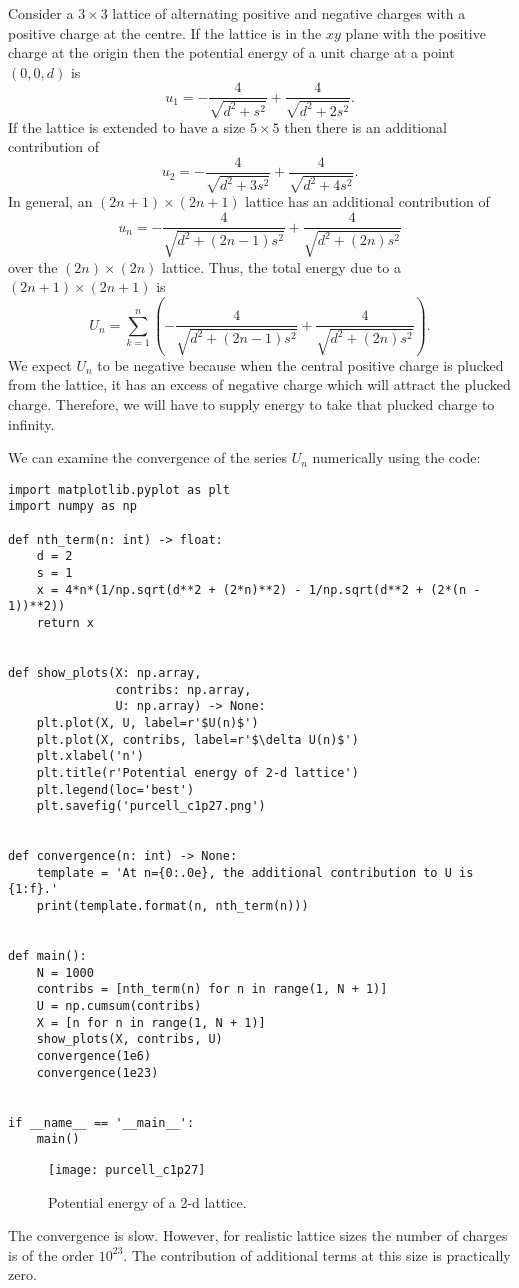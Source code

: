 \documentclass{article}
\begin{document}
\begin{enumerate}
Consider a $3 \times 3$ lattice of alternating positive and negative charges
with a positive charge at the centre. If the lattice is in the $xy$ plane with the
positive charge at the origin then the potential energy of a unit charge at a point
$(0, 0, d)$ is
\[
u_1 = -\frac{4}{\sqrt{d^2 + s^2}} + \frac{4}{\sqrt{d^2 + 2s^2}}.
\]
If the lattice is extended to have a size $5 \times 5$  then there is an additional
contribution of
\[
u_2 = -\frac{4}{\sqrt{d^2 + 3s^2}} + \frac{4}{\sqrt{d^2 + 4s^2}}.
\]
In general, an $(2n + 1) \times (2n + 1)$ lattice has an additional contribution
of 
\[
u_n =  -\frac{4}{\sqrt{d^2 + (2n - 1)s^2}} + \frac{4}{\sqrt{d^2 + (2n)s^2}}
\]
over the $(2n) \times (2n)$ lattice. Thus, the total energy due to a $(2n + 1) 
\times (2n + 1)$ is
\[
U_n = \sum_{k=1}^n\left(-\frac{4}{\sqrt{d^2 + (2n - 1)s^2}} + \frac{4}{\sqrt{d^2 + (2n)s^2}}\right).
\]
We expect $U_n$ to be negative because when the central positive charge is plucked
from the lattice, it has an excess of negative charge which will attract the 
plucked charge. Therefore, we will have to supply energy to take that plucked charge to
infinity.

We can examine the convergence of the series $U_n$ numerically using the code:
\begin{verbatim}
import matplotlib.pyplot as plt
import numpy as np

def nth_term(n: int) -> float:
    d = 2
    s = 1
    x = 4*n*(1/np.sqrt(d**2 + (2*n)**2) - 1/np.sqrt(d**2 + (2*(n - 1))**2))
    return x


def show_plots(X: np.array,
               contribs: np.array,
               U: np.array) -> None:
    plt.plot(X, U, label=r'$U(n)$')
    plt.plot(X, contribs, label=r'$\delta U(n)$')    
    plt.xlabel('n')
    plt.title(r'Potential energy of 2-d lattice')
    plt.legend(loc='best')
    plt.savefig('purcell_c1p27.png')


def convergence(n: int) -> None:
    template = 'At n={0:.0e}, the additional contribution to U is {1:f}.'
    print(template.format(n, nth_term(n)))


def main():
    N = 1000
    contribs = [nth_term(n) for n in range(1, N + 1)]
    U = np.cumsum(contribs)
    X = [n for n in range(1, N + 1)]
    show_plots(X, contribs, U)
    convergence(1e6)
    convergence(1e23)
    

if __name__ == '__main__':
    main()
\end{verbatim}
\begin{figure}[!ht]
\center
\texttt{[image: purcell\_c1p27]}
\caption{Potential energy of a 2-d lattice.}
\label{c1f2}
\end{figure}
The convergence is slow. However, for realistic lattice sizes the number of charges
is of the order $10^{23}$. The contribution of additional terms at this size is 
practically zero.


\end{enumerate}
\end{document}
